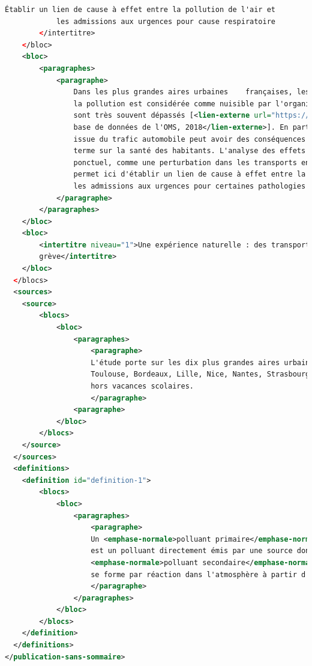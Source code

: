 \begin{lstlisting}[language=XML, basicstyle=\small]
            Établir un lien de cause à effet entre la pollution de l'air et 
            les admissions aux urgences pour cause respiratoire
        </intertitre> 
    </bloc>
    <bloc>
        <paragraphes>
            <paragraphe> 
                Dans les plus grandes aires urbaines    françaises, les seuils d'exposition au-delà desquels 
                la pollution est considérée comme nuisible par l'organisation mondiale de la santé (OMS) 
                sont très souvent dépassés [<lien-externe url="https://www.who.int/airpollution/data/cities/en/">
                base de données de l'OMS, 2018</lien-externe>]. En particulier, la pollution de l'air 
                issue du trafic automobile peut avoir des conséquences néfastes à très court 
                terme sur la santé des habitants. L'analyse des effets directs et indirects d'un événement 
                ponctuel, comme une perturbation dans les transports en commun un jour de grève, 
                permet ici d'établir un lien de cause à effet entre la pollution issue du trafic automobile et
                les admissions aux urgences pour certaines pathologies respiratoires. 
            </paragraphe>
        </paragraphes>
    </bloc>
    <bloc>
        <intertitre niveau="1">Une expérience naturelle : des transports en commun perturbés un jour de
        grève</intertitre> 
    </bloc>
  </blocs>
  <sources>
    <source>
        <blocs>
            <bloc>
                <paragraphes>
                    <paragraphe>
                    L'étude porte sur les dix plus grandes aires urbaines françaises (Paris, Lyon, Marseille,
                    Toulouse, Bordeaux, Lille, Nice, Nantes, Strasbourg, Rennes) sur la période 2010-2015, 
                    hors vacances scolaires.
                    </paragraphe> 
                <paragraphe>
            </bloc>
        </blocs>
    </source>
  </sources>
  <definitions>
    <definition id="definition-1">
        <blocs>
            <bloc>
                <paragraphes>
                    <paragraphe>
                    Un <emphase-normale>polluant primaire</emphase-normale> 
                    est un polluant directement émis par une source donnée, tandis qu'un 
                    <emphase-normale>polluant secondaire</emphase-normale> 
                    se forme par réaction dans l'atmosphère à partir d'autres polluants (l'ozone par exemple). 
                    </paragraphe>
                </paragraphes>
            </bloc>
        </blocs>
    </definition>
  </definitions>
</publication-sans-sommaire>
 
\end{lstlisting}
\label{publication-xml}
\newpage

